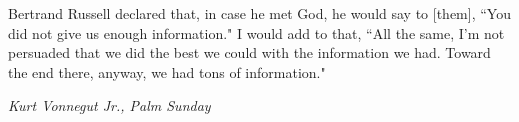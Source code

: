 
\setlength{\epigraphwidth}{\textwidth}
\epigraph{Bertrand Russell declared that, in case he met God, he would say to [them], ``You did not give us enough information." I would add to that, ``All the same, I'm not persuaded that we did the best we could with the information we had. Toward the end there, anyway, we had tons of information."}{\textit{Kurt Vonnegut Jr., Palm Sunday}}
